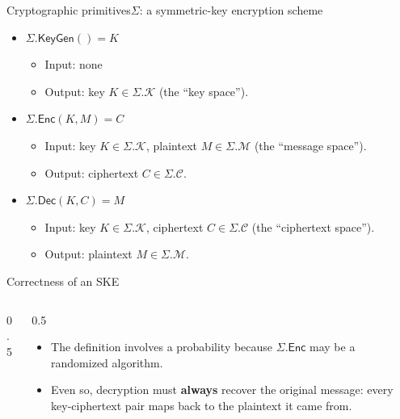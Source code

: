 \ifdefined\PRESENTATION\else\PassOptionsToClass{handout}{beamer}\fi\documentclass[aspectratio=169, lualatex]{beamer}
\begin{document}
\begin{frame}{Cryptographic primitives}{$\Sigma$: a symmetric-key encryption scheme}
	\begin{itemize}
		\item \textbf{$\Sigma.\textsf{KeyGen}() = K$}
		      \begin{itemize}
			      \item Input: none
			      \item Output: key $K \in \Sigma.\mathcal{K}$ {\tiny(the ``key space'')}.
		      \end{itemize}
		\item \textbf{$\Sigma.\textsf{Enc}(K, M) = C$}
		      \begin{itemize}
			      \item Input: key $K \in \Sigma.\mathcal{K}$, plaintext $M \in \Sigma.\mathcal{M}$ {\tiny(the ``message space'')}.
			      \item Output: ciphertext $C \in \Sigma.\mathcal{C}$.
		      \end{itemize}
		\item \textbf{$\Sigma.\textsf{Dec}(K, C) = M$}
		      \begin{itemize}
			      \item Input: key $K \in \Sigma.\mathcal{K}$, ciphertext $C \in \Sigma.\mathcal{C}$ {\tiny(the ``ciphertext space'')}.
			      \item Output: plaintext $M \in \Sigma.\mathcal{M}$.
		      \end{itemize}
	\end{itemize}
\end{frame}

\begin{frame}{Correctness of an SKE}
	\begin{columns}[c]
		\begin{column}{0.5\textwidth}
		\end{column}
		\begin{column}{0.5\textwidth}
			\begin{itemize}
				\item The definition involves a probability because $\Sigma.\textsf{Enc}$ may be a randomized algorithm.
				\item Even so, decryption must \textbf{always} recover the original message: every key-ciphertext pair maps back to the plaintext it came from.
			\end{itemize}
		\end{column}
	\end{columns}
\end{frame}
\end{document}
